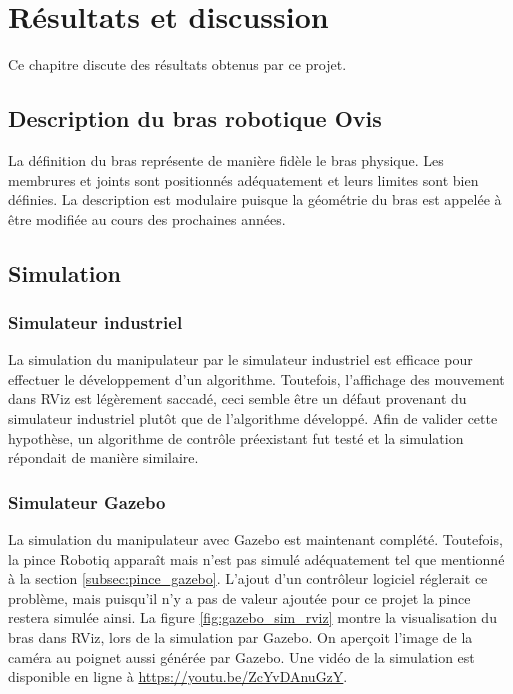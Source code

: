 \chapter{Résultats et discussion}
Ce chapitre discute des résultats obtenus par ce projet.

\section{Description du bras robotique Ovis}
La définition du bras représente de manière fidèle le bras physique. Les membrures et joints sont positionnés adéquatement et leurs limites sont bien définies. La description est modulaire puisque la géométrie du bras est appelée à être modifiée au cours des prochaines années.

\section{Simulation}
\subsection{Simulateur industriel}
La simulation du manipulateur par le simulateur industriel est efficace pour effectuer le développement d'un algorithme. Toutefois, l'affichage des mouvement dans RViz est légèrement saccadé, ceci semble être un défaut provenant du simulateur industriel plutôt que de l'algorithme développé. Afin de valider cette hypothèse, un algorithme de contrôle préexistant fut testé et la simulation répondait de manière similaire.

\subsection{Simulateur Gazebo}
La simulation du manipulateur avec Gazebo est maintenant complété. Toutefois, la pince Robotiq apparaît mais n'est pas simulé adéquatement tel que mentionné à la section \ref{subsec:pince_gazebo}. L'ajout d'un contrôleur logiciel réglerait ce problème, mais puisqu'il n'y a pas de valeur ajoutée pour ce projet la pince restera simulée ainsi. La figure \ref{fig:gazebo_sim_rviz} montre la visualisation du bras dans RViz, lors de la simulation par Gazebo. On aperçoit l'image de la caméra au poignet aussi générée par Gazebo.
Une vidéo de la simulation est disponible en ligne à \url{https://youtu.be/ZcYvDAnuGzY}.

